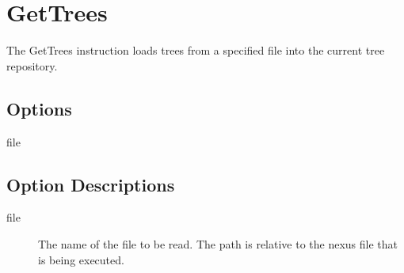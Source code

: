 \section{GetTrees}

The GetTrees instruction loads trees from a specified file into the current tree repository.

\subsection{Options}
\begin{description}
\item[file]
\end{description}

\subsection{Option Descriptions}

\begin{description}
\item[file] The name of the file to be read.  The path is relative to the nexus file that is being executed.
\end{description}